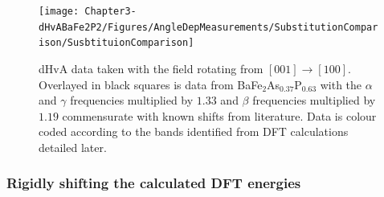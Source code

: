 \begin{figure}
    \begin{center}
        \texttt{[image: Chapter3-dHvABaFe2P2/Figures/AngleDepMeasurements/SubstitutionComparison/SusbtituionComparison]}
        \caption{dHvA data taken with the field rotating from $[001]\rightarrow[100]$. Overlayed in black squares is data from BaFe$_2$As$_{0.37}$P$_{0.63}$\cite{Analytis2010c} with the $\alpha$ and $\gamma$ frequencies multiplied by $1.33$ and $\beta$ frequencies multiplied by $1.19$ commensurate with known shifts from literature. Data is colour coded according to the bands identified from DFT calculations detailed later.}
        \label{Fig:3:SubstitutionComparison}
    \end{center}
\end{figure}

\subsubsection{Rigidly shifting the calculated DFT energies}

